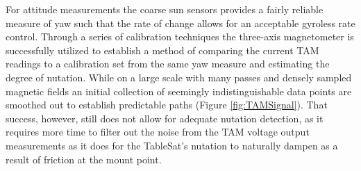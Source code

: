 For attitude measurements the coarse sun sensors provides a fairly reliable measure of yaw such that the rate of change allows for an acceptable gyroless rate control.  Through a series of calibration techniques the three-axis magnetometer is successfully utilized to establish a method of comparing the current TAM readings to a calibration set from the same yaw measure and estimating the degree of nutation.  While on a large scale with many passes and densely sampled magnetic fields an initial collection of seemingly indistinguishable data points are smoothed out to establish predictable paths (Figure \ref{fig:TAMSignal}).  That success, however, still does not allow for adequate nutation detection, as it requires more time to filter out the noise from the TAM voltage output measurements as it does for the TableSat's nutation to naturally dampen as a result of friction at the mount point.
